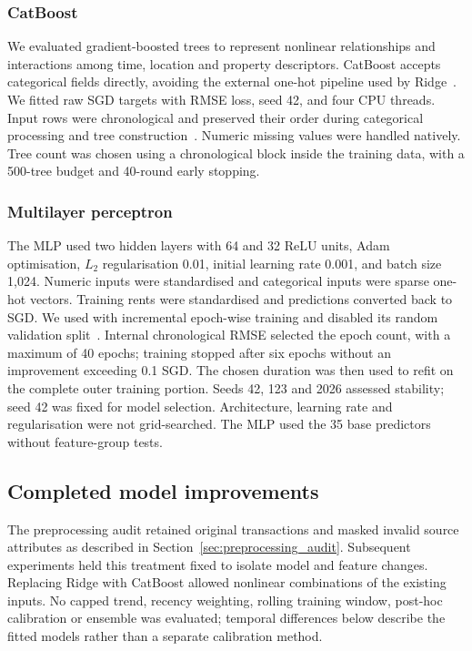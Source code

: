 \documentclass[conference]{IEEEtran}
\newcommand{\field}[1]{\texttt{\detokenize{#1}}}
\begin{document}
\subsubsection{CatBoost}
We evaluated gradient-boosted trees to represent nonlinear relationships
and interactions among time, location and property descriptors. CatBoost
accepts categorical fields directly, avoiding the external one-hot pipeline
used by Ridge~\cite{final_model_reference}. We fitted raw SGD targets with
RMSE loss, seed 42, and four CPU threads. Input rows were chronological and
\field{has_time=True} preserved their order during categorical processing
and tree construction~\cite{catboost_parameters}. Numeric missing values
were handled natively. Tree count was chosen using a chronological block
inside the training data, with a 500-tree budget and 40-round early stopping.

\subsubsection{Multilayer perceptron}
The MLP used two hidden layers with 64 and 32 ReLU units, Adam optimisation,
$L_2$ regularisation 0.01, initial learning rate 0.001, and batch size 1,024.
Numeric inputs were standardised and categorical inputs were sparse one-hot
vectors. Training rents were standardised and predictions converted back
to SGD. We used \field{MLPRegressor} with incremental epoch-wise training
and disabled its random validation split~\cite{mlp_reference}. Internal
chronological RMSE selected the epoch count, with a maximum of 40 epochs;
training stopped after six epochs without an improvement exceeding 0.1 SGD.
The chosen duration was then used to refit on the complete outer training
portion. Seeds 42, 123 and 2026 assessed stability; seed 42 was fixed for
model selection. Architecture, learning rate and regularisation were not
grid-searched. The MLP used the 35 base predictors without feature-group tests.

\subsection{Completed model improvements}
\label{sec:improvements}
The preprocessing audit retained original transactions and masked invalid
source attributes as described in Section~\ref{sec:preprocessing_audit}.
Subsequent experiments held this treatment fixed to isolate model and
feature changes. Replacing Ridge with CatBoost allowed nonlinear combinations
of the existing inputs. No capped trend, recency weighting, rolling training
window, post-hoc calibration or ensemble was evaluated; temporal differences
below describe the fitted models rather than a separate calibration method.
\end{document}
